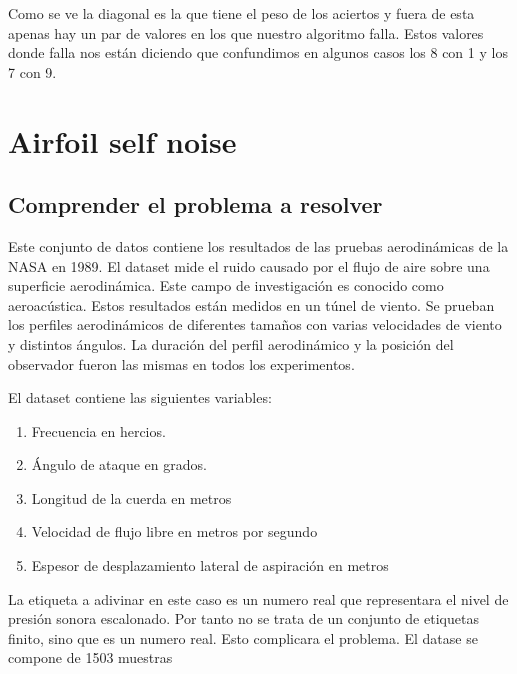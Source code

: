\documentclass[titlepage]{article}
\begin{document}
Como se ve la diagonal es la que tiene el peso de los aciertos y fuera de esta apenas hay un par de valores en los que nuestro algoritmo falla. Estos valores donde falla nos están diciendo que confundimos en algunos casos los 8 con 1 y los 7 con 9. 



\section{Airfoil self noise}
\subsection{Comprender el problema a resolver}
Este conjunto de datos contiene los resultados de las pruebas aerodinámicas de la NASA en 1989. El dataset mide el ruido causado por el flujo de aire sobre una superficie aerodinámica. Este campo de investigación es conocido como aeroacústica. Estos resultados están medidos en un túnel de viento. Se prueban los perfiles aerodinámicos de diferentes tamaños con varias velocidades de viento y distintos ángulos. La duración del perfil aerodinámico y la posición del observador fueron las mismas en todos los experimentos.

El dataset contiene las siguientes variables:
\begin{enumerate}
	\item Frecuencia en hercios.
	\item Ángulo de ataque en grados.
	\item Longitud de la cuerda en metros
	\item Velocidad de flujo libre en metros por segundo
	\item Espesor de desplazamiento lateral de aspiración en metros
\end{enumerate}

La etiqueta a adivinar en este caso es un numero real que representara el nivel de presión sonora escalonado. Por tanto no se trata de un conjunto de etiquetas finito, sino que es un numero real. Esto complicara el problema. 
El datase se compone de 1503 muestras
\end{document}
